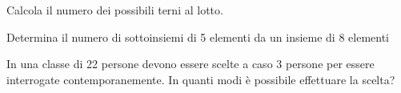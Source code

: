 \begin{esercizio}
\label{ese:C.2}
Calcola il numero dei possibili terni al lotto.
\end{esercizio}

\begin{esercizio}
\label{ese:C.3}
Determina il numero di sottoinsiemi di 5 elementi da un insieme di 8 elementi
\end{esercizio}

\begin{esercizio}
\label{ese:C.4}
In una classe di 22 persone devono essere scelte a caso 3 persone per essere interrogate contemporanemente. In quanti modi è possibile effettuare la scelta?
\end{esercizio}


\begin{comment}
\subsection{Esercizi riepilogativi}

\begin{esercizio}
\label{ese:R.1}
Quante sono le diagonali di un ottagono?
\end{esercizio}

\begin{esercizio}
\label{ese:R.2}
In un torneo di calcio a otto squadre, ogni squadra deve giocare una partita contro ognuna delle altre. Quante partite si giocheranno?
\end{esercizio}
\end{comment}
